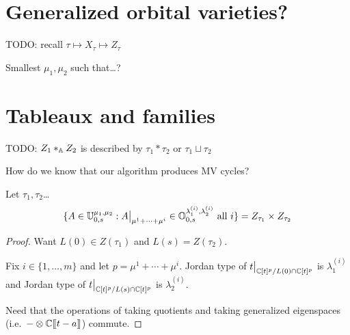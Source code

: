 \documentclass[draft]{article}
\begin{document}
\appendix

\section{Generalized orbital varieties?}
TODO: recall $\tau\mapsto X_\tau \mapsto Z_\tau$

\begin{question}
    Smallest $\mu_1, \mu_2$ such that\dots?
\end{question}

\section{Tableaux and families}

TODO: $Z_1\ast_\AA Z_2$ is described by $\tau_1\ast\tau_2$ or $\tau_1\sqcup\tau_2$

\begin{question}
    How do we know that our algorithm produces MV cycles? 
\end{question}

\begin{proposition}
    Let $\tau_1,\tau_2$\dots 
    \[
    \{A\in\UU_{0,s}^{\mu_1,\mu_2} : A \big|_{\mu^1 + \cdots + \mu^i} \in \OO_{0,s}^{\lambda_{1}^{(i)},\lambda_2^{(i)}} \text{ all } i\} = Z_{\tau_1}\times Z_{\tau_2}
    \]
\end{proposition}

\begin{proof}
    Want $L(0) \in Z(\tau_1)$ and $L(s) = Z(\tau_2)$. 

    Fix $i \in \{1,\dots,m\}$ and let $p = \mu^1 + \cdots + \mu^i$. 
    Jordan type of $t\big|_{\CC[t]^p/L(0)\cap\CC[t]^p}$ is $\lambda_1^{(i)}$ and Jordan type of $t\big|_{\CC[t]^p/L(s)\cap \CC[t]^p}$ is $\lambda_2^{(i)}$. 

    Need that the operations of taking quotients and taking generalized eigenspaces (i.e.\ $-\otimes\CC\xt[t-a]$) commute.
\end{proof}
\end{document}
